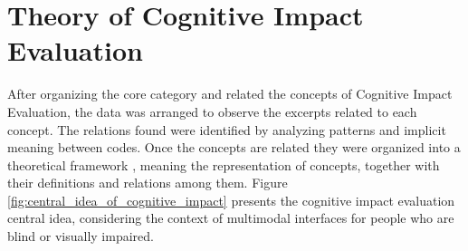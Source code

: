 \begin{landscape}
	\begin{figure}[h] 

       \captionsetup{width=25cm}%
	\end{figure}
\end{landscape}

\section{Theory of Cognitive Impact Evaluation}
\label{sec:results-theory}

After organizing the core category and related the concepts of Cognitive Impact Evaluation, the data was arranged to observe the excerpts related to each concept. The relations found were identified by analyzing patterns and implicit meaning between codes. Once the concepts are related they were organized into a theoretical framework \cite{Corbin1998}, meaning the representation of concepts, together with their definitions and relations among them. Figure \ref{fig:central_idea_of_cognitive_impact} presents the cognitive impact evaluation central idea, considering the context of multimodal interfaces for people who are blind or visually impaired.

	\begin{figure}[h] 

   	    \captionsetup{width=16cm}%
	\end{figure}
